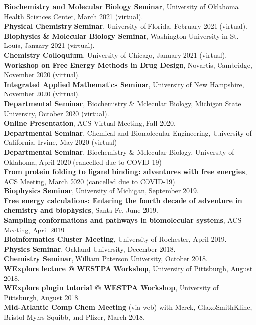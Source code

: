 \documentclass[margin,line]{res}
\begin{document}
\begin{resume}
{\bf Biochemistry and Molecular Biology Seminar}, University of Oklahoma Health Sciences Center, March 2021 (virtual).\\
{\bf Physical Chemistry Seminar}, University of Florida, February 2021 (virtual).\\
{\bf Biophysics \& Molecular Biology Seminar}, Washington University in St. Louis, January 2021 (virtual).\\
{\bf Chemistry Colloquium}, University of Chicago, January 2021 (virtual).\\
{\bf Workshop on Free Energy Methods in Drug Design}, Novartis, Cambridge, November 2020 (virtual).\\
{\bf Integrated Applied Mathematics Seminar}, University of New Hampshire, November 2020 (virtual).\\
{\bf Departmental Seminar}, Biochemistry \& Molecular Biology, Michigan State University, October 2020 (virtual).\\
{\bf Online Presentation}, ACS Virtual Meeting, Fall 2020.\\
{\bf Departmental Seminar}, Chemical and Biomolecular Engineering, University of California, Irvine, May 2020 (virtual) \\
{\bf Departmental Seminar}, Biochemistry \& Molecular Biology, University of Oklahoma, April 2020 (cancelled due to COVID-19) \\
{\bf From protein folding to ligand binding: adventures with free energies}, ACS Meeting, March 2020 (cancelled due to COVID-19) \\
{\bf Biophysics Seminar}, University of Michigan, September 2019.\\
{\bf Free energy calculations: Entering the fourth decade of adventure in chemistry and biophysics}, Santa Fe, June 2019.\\
{\bf Sampling conformations and pathways in biomolecular systems}, ACS Meeting, April 2019.\\
{\bf Bioinformatics Cluster Meeting}, University of Rochester, April 2019.\\
{\bf Physics Seminar}, Oakland University, December 2018.\\
{\bf Chemistry Seminar}, William Paterson University, October 2018.\\
{\bf WExplore lecture @ WESTPA Workshop}, University of Pittsburgh, August 2018.\\
{\bf WExplore plugin tutorial @ WESTPA Workshop}, University of Pittsburgh, August 2018.\\
{\bf Mid-Atlantic Comp Chem Meeting} (via web) with Merck, GlaxoSmithKline, Bristol-Myers Squibb, and Pfizer, March 2018. \\

\end{resume}
\end{document}

